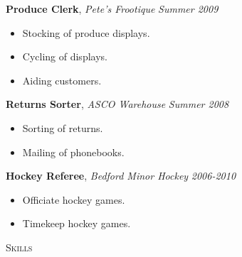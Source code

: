 \documentclass[9pt]{article}
\newenvironment{changemargin}[2]{%
  \begin{list}{}{%
    \setlength{\topsep}{0pt}%
    \setlength{\leftmargin}{#1}%
    \setlength{\rightmargin}{#2}%
    \setlength{\listparindent}{\parindent}%
    \setlength{\itemindent}{\parindent}%
    \setlength{\parsep}{\parskip}%
  }%
  \item[]}{\end{list}
}
\newcommand{\lineover}{
	\begin{changemargin}{-0.05in}{-0.05in}
		\vspace*{-8pt}
		\hrulefill \\
		\vspace*{-2pt}
	\end{changemargin}
}
\newcommand{\header}[1]{
	\begin{changemargin}{-0.5in}{-0.5in}
		\scshape{#1}\\
  	\lineover
	\end{changemargin}
}
\newenvironment{body} {
	\vspace*{-16pt}
	\begin{changemargin}{-0.25in}{-0.5in}
  }	
	{\end{changemargin}
}
\begin{document}
\begin{body}
\begin{body}
	\textbf {Produce Clerk}, \emph{Pete's Frootique} \hfill \emph{Summer 2009}\\
	\vspace*{-4pt}
	\begin{itemize} \itemsep -0pt
		\item Stocking of produce displays. 
		\item Cycling of displays. 
		\item Aiding customers.
	\end{itemize}

	\textbf {Returns Sorter}, \emph{ASCO Warehouse} \hfill \emph{Summer 2008}\\
	\vspace*{-4pt}
	\begin{itemize} \itemsep -0pt
		\item Sorting of returns.  
		\item Mailing of phonebooks. 		
	\end{itemize}

	\textbf {Hockey Referee}, \emph{Bedford Minor Hockey} \hfill \emph{2006-2010}\\
	\vspace*{-4pt}
	\begin{itemize} \itemsep -0pt
		\item Officiate hockey games.
		\item Timekeep hockey games. 		
	\end{itemize}

\end{body}

\smallskip







\header{Skills}

\begin{body}
	\vspace{14pt}


\end{body}
\end{body}
\end{document}

